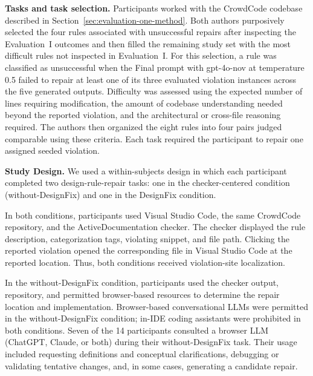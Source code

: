 \textbf{Tasks and task selection.}
Participants worked with the CrowdCode codebase described in
Section~\ref{sec:evaluation-one-method}. Both authors purposively selected the four rules associated with
unsuccessful repairs after inspecting
the Evaluation~I outcomes and then filled the remaining study set with the
most difficult rules not inspected in Evaluation~I. For this selection, a rule was classified as unsuccessful when the Final prompt with gpt-4o-nov at temperature 0.5 failed to repair at least one of its three evaluated violation instances across the five
generated outputs. Difficulty was
assessed using the expected number of lines requiring modification, the
amount of codebase understanding needed beyond the reported violation,
and the architectural or cross-file reasoning required. The authors
then organized the eight rules into four pairs judged comparable using
these criteria. Each task required the participant to repair one assigned seeded
violation.

\textbf{Study Design.}
We used a within-subjects design in which each participant completed
two design-rule-repair tasks: one in the checker-centered condition
(without-DesignFix) and one in the DesignFix condition.

In both conditions, participants used Visual Studio Code, the same
CrowdCode repository, and the ActiveDocumentation checker. The checker
displayed the rule description, categorization tags, violating snippet,
and file path. Clicking the reported violation opened the corresponding
file in Visual Studio Code at the reported location. Thus, both
conditions received violation-site localization.

In the without-DesignFix condition, participants used the checker
output, repository, and permitted browser-based resources to determine
the repair location and implementation. Browser-based conversational LLMs were permitted in the without-DesignFix condition; in-IDE coding
assistants were prohibited in both conditions. Seven of the 14
participants consulted a browser LLM (ChatGPT, Claude, or both) during
their without-DesignFix task. Their usage included requesting
definitions and conceptual clarifications, debugging or validating
tentative changes, and, in some cases, generating a candidate repair.

